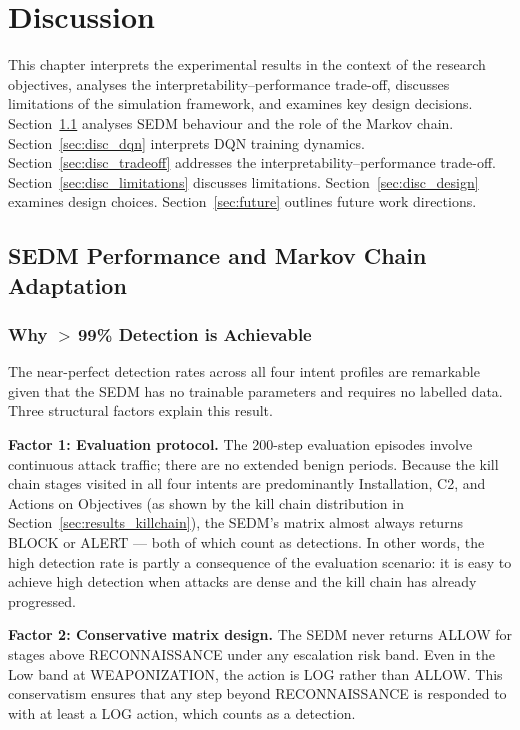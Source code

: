 \chapter{Discussion}
\label{ch:discussion}

This chapter interprets the experimental results in the context of the
research objectives, analyses the interpretability--performance trade-off,
discusses limitations of the simulation framework, and examines key
design decisions.
Section~\ref{sec:disc_sedm} analyses SEDM behaviour and the role of the
Markov chain.
Section~\ref{sec:disc_dqn} interprets DQN training dynamics.
Section~\ref{sec:disc_tradeoff} addresses the interpretability--performance
trade-off.
Section~\ref{sec:disc_limitations} discusses limitations.
Section~\ref{sec:disc_design} examines design choices.
Section~\ref{sec:future} outlines future work directions.

\section{SEDM Performance and Markov Chain Adaptation}
\label{sec:disc_sedm}

\subsection{Why $>$\,99\% Detection is Achievable}

The near-perfect detection rates across all four intent profiles are
remarkable given that the SEDM has no trainable parameters and requires
no labelled data.
Three structural factors explain this result.

\textbf{Factor 1: Evaluation protocol.}
The 200-step evaluation episodes involve continuous attack traffic; there
are no extended benign periods.
Because the kill chain stages visited in all four intents are predominantly
Installation, C2, and Actions on Objectives (as shown by the kill chain
distribution in Section~\ref{sec:results_killchain}), the SEDM's matrix
almost always returns BLOCK or ALERT --- both of which count as detections.
In other words, the high detection rate is partly a consequence of the
evaluation scenario: it is easy to achieve high detection when attacks are
dense and the kill chain has already progressed.

\textbf{Factor 2: Conservative matrix design.}
The SEDM never returns ALLOW for stages above RECONNAISSANCE under any
escalation risk band.
Even in the Low band at WEAPONIZATION, the action is LOG rather than ALLOW.
This conservatism ensures that any step beyond RECONNAISSANCE is responded
to with at least a LOG action, which counts as a detection.

